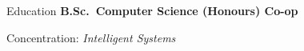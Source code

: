 \begin{rubric}{Education}
%
	\textbf{B.Sc.~Computer Science (Honours) Co-op}\par
	Concentration: \emph{Intelligent Systems}
\end{rubric}